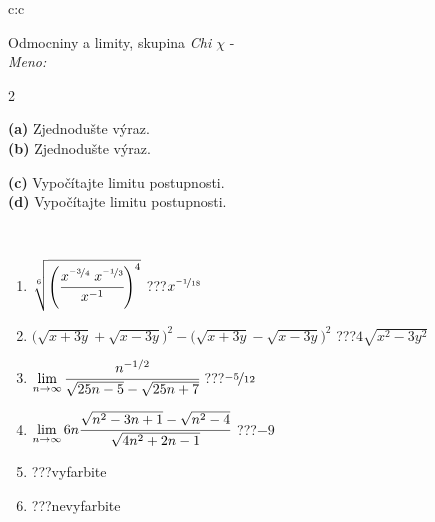 \documentclass[10pt]{report}
\begin{document}
\begin{tabular}{c:c}
\begin{minipage}[c][104.5mm][t]{0.5\linewidth}
\begin{center}
\vspace{7mm}
{\huge Odmocniny a limity, skupina \textit{Chi $\chi$} -}\\[5mm]
\textit{Meno:}\phantom{xxxxxxxxxxxxxxxxxxxxxxxxxxxxxxxxxxxxxxxxxxxxxxxxxxxxxxxxxxxxxxxxx}\\[5mm]
\begin{minipage}{0.95\linewidth}
\begin{center}
{\small \begin{multicols}{2} \raggedright
\textbf{(a)} Zjednodušte výraz. \\[1mm]
\textbf{(b)} Zjednodušte výraz. \par \columnbreak
\textbf{(c)} Vypočítajte limitu postupnosti. \\[1mm]
\textbf{(d)} Vypočítajte limitu postupnosti.
\end{multicols}
}
\end{center}
\end{minipage}
\\[4mm]
\begin{minipage}{0.79\linewidth}
\begin{center}
\begin{varwidth}{\linewidth}
\begin{enumerate}
\small
\item $\sqrt[6]{\left(\cfrac{x^{\nicefrac{-3}{4}}\;x^{\nicefrac{-1}{3}}}{x^{-1}}\right)^{4}}$\quad \dotfill\; ???\;\dotfill \quad $x^{\nicefrac{-1}{18}}$
\item {\footnotesize{\scriptsize$\big(\sqrt{x+3y}+\sqrt{x-3y}\big)^2-\big(\sqrt{x+3y}-\sqrt{x-3y}\big)^2$}\quad \dotfill\; ???\;\dotfill \quad $4\sqrt{x^2-3y^2}$}
\item $\lim\limits_{n\to\infty}\cfrac{n^{-1/2}}{\sqrt{25n-5}-\sqrt{25n+7}}$\quad \dotfill\; ???\;\dotfill \quad $\nicefrac{-5}{12}$
\item $\lim\limits_{n\to\infty}6n\cfrac{\sqrt{n^2-3n+1}-\sqrt{n^2-4}}{\sqrt{4n^2+2n-1}}$\quad \dotfill\; ???\;\dotfill \quad $-9$
\item \quad \dotfill\; ???\;\dotfill \quad vyfarbite
\item \quad \dotfill\; ???\;\dotfill \quad nevyfarbite
\end{enumerate}
\end{varwidth}
\end{center}
\end{minipage}

\end{center}
\end{minipage}
\end{tabular}
\end{document}
